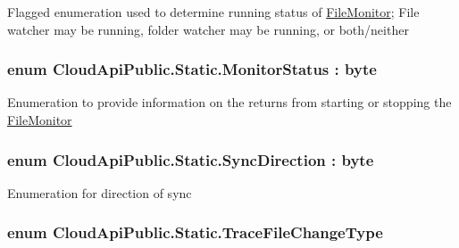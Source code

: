 Flagged enumeration used to determine running status of \hyperlink{namespace_file_monitor}{File\-Monitor}; File watcher may be running, folder watcher may be running, or both/neither 

\hypertarget{namespace_cloud_api_public_1_1_static_a31db95951688473984962a22ad05a45f}{
\subsubsection[{Monitor\-Status}]{\setlength{\rightskip}{0pt plus 5cm}enum {\bf Cloud\-Api\-Public.\-Static.\-Monitor\-Status} \-: byte}}\label{namespace_cloud_api_public_1_1_static_a31db95951688473984962a22ad05a45f}


Enumeration to provide information on the returns from starting or stopping the \hyperlink{namespace_file_monitor}{File\-Monitor} 

\hypertarget{namespace_cloud_api_public_1_1_static_a8ba5d1f6d06fa058730616f021c8974f}{
\subsubsection[{Sync\-Direction}]{\setlength{\rightskip}{0pt plus 5cm}enum {\bf Cloud\-Api\-Public.\-Static.\-Sync\-Direction} \-: byte}}\label{namespace_cloud_api_public_1_1_static_a8ba5d1f6d06fa058730616f021c8974f}


Enumeration for direction of sync 

\hypertarget{namespace_cloud_api_public_1_1_static_aadccab0d764f187bdd87a34e98676034}{
\subsubsection[{Trace\-File\-Change\-Type}]{\setlength{\rightskip}{0pt plus 5cm}enum {\bf Cloud\-Api\-Public.\-Static.\-Trace\-File\-Change\-Type}}}\label{namespace_cloud_api_public_1_1_static_aadccab0d764f187bdd87a34e98676034}




